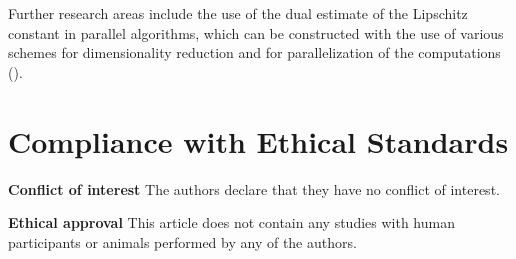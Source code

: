 \documentclass[twocolumn]{svjour3}          %
\begin{document}
	Further research areas include the use of the dual estimate of the Lipschitz constant in parallel algorithms, which can be constructed with the use of various schemes for  dimensionality reduction and  for parallelization of the computations (\cite{Strongin2018}).




\section*{Compliance with Ethical Standards}
\textbf{Conflict of interest} The authors declare that they have no conflict of interest.

\textbf{Ethical approval} This article does not contain any studies with human participants or
animals performed by any of the authors.



\end{document}
